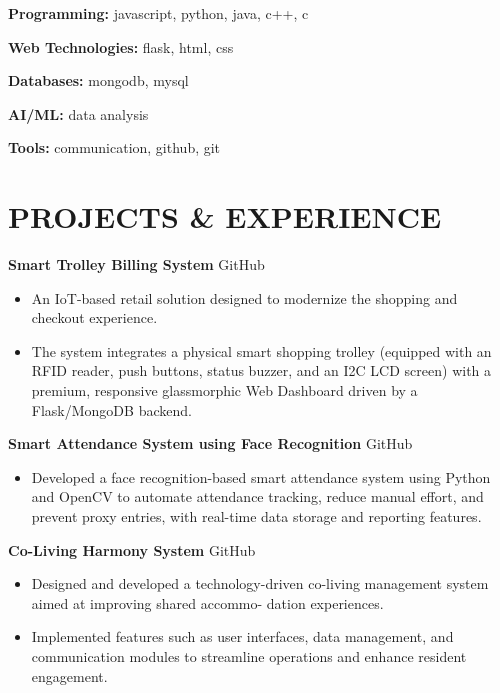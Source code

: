 \documentclass[9pt,a4paper]{extarticle}
\begin{document}
\textbf{Programming:} javascript, python, java, c++, c

\textbf{Web Technologies:} flask, html, css

\textbf{Databases:} mongodb, mysql

\textbf{AI/ML:} data analysis

\textbf{Tools:} communication, github, git


\section*{PROJECTS \& EXPERIENCE}

\noindent \textbf{Smart Trolley Billing System} \hfill GitHub
\begin{itemize}[leftmargin=*, parsep=0pt, itemsep=1pt, topsep=1pt]
    \item An IoT-based retail solution designed to modernize the shopping and checkout experience.
    \item The system integrates a physical smart shopping trolley (equipped with an RFID reader, push buttons, status buzzer, and an I2C LCD screen) with a premium, responsive glassmorphic Web Dashboard driven by a Flask/MongoDB backend.
\end{itemize}
\vspace{2pt}
\noindent \textbf{Smart Attendance System using Face Recognition} \hfill GitHub
\begin{itemize}[leftmargin=*, parsep=0pt, itemsep=1pt, topsep=1pt]
    \item Developed a face recognition-based smart attendance system using Python and OpenCV to automate attendance tracking, reduce manual effort, and prevent proxy entries, with real-time data storage and reporting features.
\end{itemize}
\vspace{2pt}
\noindent \textbf{Co-Living Harmony System} \hfill GitHub
\begin{itemize}[leftmargin=*, parsep=0pt, itemsep=1pt, topsep=1pt]
    \item Designed and developed a technology-driven co-living management system aimed at improving shared accommo- dation experiences.
    \item Implemented features such as user interfaces, data management, and communication modules to streamline operations and enhance resident engagement.
\end{itemize}
\vspace{2pt}
\end{document}
